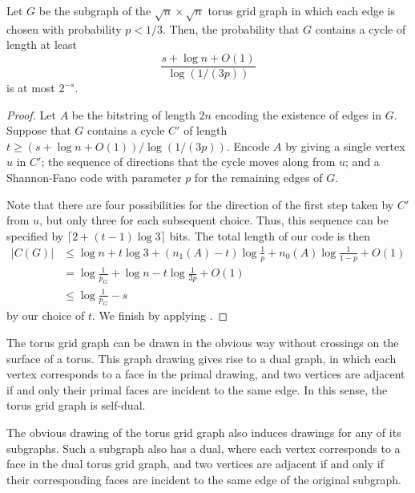 \begin{thm}
  Let $G$ be the subgraph of the $\sqrt{n} \times \sqrt{n}$ torus grid
  graph in which each edge is chosen with probability $p < 1/3$. Then,
  the probability that $G$ contains a cycle of length at least
  \[\frac{s + \log n + O(1)}{\log (1/(3p))}\]
  is at most $2^{-s}$.
\end{thm}
\begin{proof}
  Let $A$ be the bitstring of length $2n$ encoding the existence of
  edges in $G$. Suppose that $G$ contains a cycle $C'$ of length
  $t \geq (s + \log n + O(1))/\log (1/(3p))$. Encode $A$ by giving a
  single vertex $u$ in $C'$; the sequence of directions that the cycle
  moves along from $u$; and a Shannon-Fano code with parameter $p$ for
  the remaining edges of $G$.

  Note that there are four possibilities for the direction of the
  first step taken by $C'$ from $u$, but only three for each
  subsequent choice. Thus, this sequence can be specified by
  $\lceil 2 + (t - 1) \log 3 \rceil$ bits. The total length of our
  code is then
  \begin{align*}
    |C(G)| &\leq \log n + t \log 3 + (n_1(A) - t) \log \frac{1}{p} +
             n_0(A) \log \frac{1}{1 - p} + O(1) \\
           &= \log \frac{1}{p_G} + \log n - t \log \frac{1}{3p} + O(1) \\
           &\leq \log \frac{1}{p_G} - s
  \end{align*}
  by our choice of $t$. We finish by applying .
\end{proof}

The torus grid graph can be drawn in the obvious way without crossings
on the surface of a torus. This graph drawing gives rise to a dual
graph, in which each vertex corresponds to a face in the primal
drawing, and two vertices are adjacent if and only their primal faces
are incident to the same edge. In this sense, the torus grid graph is
self-dual.

The obvious drawing of the torus grid graph also induces drawings for
any of its subgraphs. Such a subgraph also has a dual, where each
vertex corresponds to a face in the dual torus grid graph, and two
vertices are adjacent if and only if their corresponding faces are
incident to the same edge of the original subgraph.

